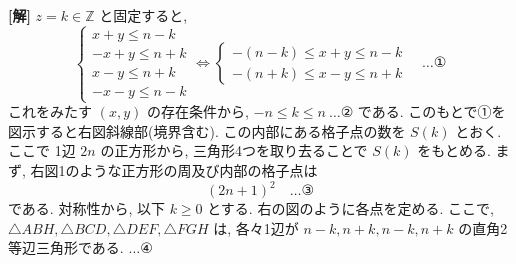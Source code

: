 \documentclass[../main.tex]{subfiles}
\begin{document}
\noindent
\textbf{[解]} $z = k \in \mathbb{Z}$ と固定すると,
\[
  \begin{cases}
    x + y \le n - k \\
    -x + y \le n + k \\
    x - y \le n + k \\
    -x - y \le n - k
  \end{cases}
  \iff
  \begin{cases} -(n-k) \le x + y \le n - k \\ -(n+k) \le x - y \le n + k
  \end{cases} \quad \dots \text{①}
\]
これをみたす $(x, y)$ の存在条件から, $-n \le k \le n \ \dots \text{②}$ である. このもとで①を図示すると右図斜線部(境界含む). この内部にある格子点の数を $S(k)$ とおく. ここで 1辺 $2n$ の正方形から, 三角形4つを取り去ることで $S(k)$ をもとめる. まず, 右図1のような正方形の周及び内部の格子点は
\[
  (2n + 1)^2 \quad \dots \text{③}
\]
である. 対称性から, 以下 $k \ge 0$ とする. 右の図のように各点を定める. ここで, $\triangle ABH, \triangle BCD, \triangle DEF, \triangle FGH$ は, 各々1辺が $n-k, n+k, n-k, n+k$ の直角2等辺三角形である. $\dots \text{④}$
\end{document}
